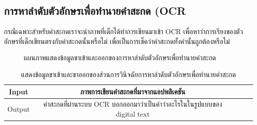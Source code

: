 \documentclass[12pt,oneside,openright,a4paper]{cpe-thai-project}
\begin{document}
 \subsection{การหาลำดับตัวอักษรเพื่อทำนายคำสะกด (OCR}
  กรณีเฉพาะสำหรับคำสะกดเราจะนำภาพที่เด็กได้ทำการเขียนมาเข้า OCR เพื่อหาว่าการเรียงของตัวอักษรที่เด็กเขียนตรงกับคำสะกดนั้นหรือไม่ เพื่อเป็นการเช็คว่าคำสะกดทั้งคำนั้นถูกต้องหรือไม่
  \begin{figure}[!ht]\centering
    \setlength{\fboxrule}{0.2mm} %
    \setlength{\fboxsep}{1cm}
    \caption{แผนภาพแสดงข้อมูลขาเข้าและออกของการหาลำดับตัวอักษรเพื่อทำนายคำสะกด}\label{fig:system}
   \end{figure}
  \begin{table}[!h]\centering
    \caption{แสดงข้อมูลขาเข้าและขาออกของส่วนการวินิจฉัยการหาลำดับตัวอักษรเพื่อทำนายคำสะกด}\label{tbl:application1}
    \begin{tabular}{c|c|l|rr} \hline
    Input & ภาพการเขียนคำสะกดที่มาจากแอปพลิเคชัน  \\ \hline
    Output & คำสะกดที่ผ่านระบบ OCR บอกออกมาว่าเป็นคำว่าอะไรในในรูปแบบของ digital text \\ \hline
    \end{tabular}
    \end{table}
\newpage
\end{document}
